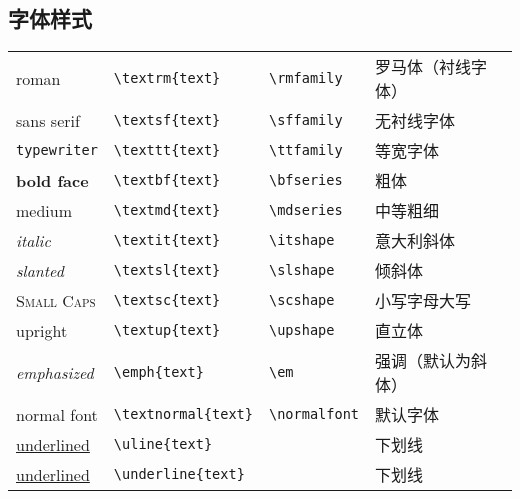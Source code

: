 \subsection{字体样式}
\begin{table}[h]
	\centering
	\begin{tabular}{l l l l}
		\hline
		\hline
		\textrm{roman}           & \verb|\textrm{|{\color{gray}\verb|text|}\verb|}|     & \verb|\rmfamily|   & 罗马体（衬线字体） \\
		\textsf{sans serif}      & \verb|\textsf{|{\color{gray}\verb|text|}\verb|}|     & \verb|\sffamily|   & 无衬线字体 \\
		\texttt{typewriter}      & \verb|\texttt{|{\color{gray}\verb|text|}\verb|}|     & \verb|\ttfamily|   & 等宽字体 \\
		\hline
		\textbf{bold face}       & \verb|\textbf{|{\color{gray}\verb|text|}\verb|}|     & \verb|\bfseries|   & 粗体 \\
		\textmd{medium}          & \verb|\textmd{|{\color{gray}\verb|text|}\verb|}|     & \verb|\mdseries|   & 中等粗细 \\
		\hline
		\textit{italic}          & \verb|\textit{|{\color{gray}\verb|text|}\verb|}|     & \verb|\itshape|    & 意大利斜体 \\
		\textsl{slanted}         & \verb|\textsl{|{\color{gray}\verb|text|}\verb|}|     & \verb|\slshape|    & 倾斜体 \\
		\textsc{Small Caps}      & \verb|\textsc{|{\color{gray}\verb|text|}\verb|}|     & \verb|\scshape|    & 小写字母大写 \\
		\textup{upright}         & \verb|\textup{|{\color{gray}\verb|text|}\verb|}|     & \verb|\upshape|    & 直立体 \\
		\hline
		\emph{emphasized}        & \verb|\emph{|{\color{gray}\verb|text|}\verb|}|       & \verb|\em|         & 强调（默认为斜体） \\
		\textnormal{normal font} & \verb|\textnormal{|{\color{gray}\verb|text|}\verb|}| & \verb|\normalfont| & 默认字体 \\
		\uline{underlined}       & \verb|\uline{|{\color{gray}\verb|text|}\verb|}|      &                    & 下划线 \\
		\underline{underlined}   & \verb|\underline{|{\color{gray}\verb|text|}\verb|}|  &                    & 下划线 \\
		\hline
		\hline
	\end{tabular}
\end{table}

